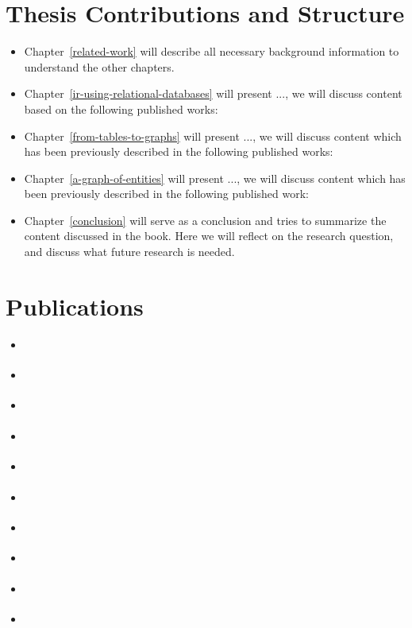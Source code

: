\section{Thesis Contributions and Structure}

\begin{itemize}
\item Chapter~\ref{related-work} will describe all necessary background information to understand the other chapters. 

\item Chapter~\ref{ir-using-relational-databases} will present ..., we will discuss content based on the following published works: \citep{Kamphuis2020BM25, olddog-docker}

\item Chapter~\ref{from-tables-to-graphs} will present ..., we will discuss content which has been previously described in the following published works: \citep{need-graph-db, geesedb}

\item Chapter~\ref{a-graph-of-entities} will present ..., we will discuss content which has been previously described in the following published work: \citep{rebl}

\item Chapter~\ref{conclusion} will serve as a conclusion and tries to summarize the content discussed in the book. Here we will reflect on the research question, and discuss what future research is needed.
\end{itemize}

\section{Publications}

\begin{itemize}
	\item \cite{olddog-docker}
	\item \cite{need-graph-db}
	\item \cite{trec-2019}
	\item \cite{ciff}	
	\item \cite{Kamphuis2020BM25}
	\item \cite{trec-2020}
	\item \cite{trec-covid}
	\item \cite{graphdb-for-ir}
	\item \cite{geesedb}
	\item \cite{rebl}
\end{itemize}
